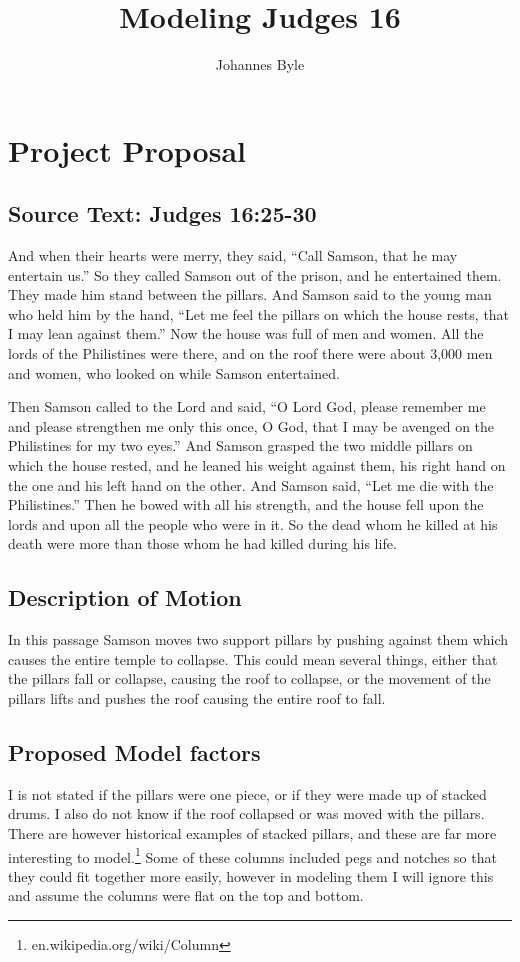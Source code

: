 \documentclass{article}
\begin{document}
\title{Modeling Judges 16}
\author{Johannes Byle}
\maketitle

\section*{Project Proposal}
\subsection*{Source Text: Judges 16:25-30}
And when their hearts were merry, they said, “Call Samson, that he may entertain us.” So they called Samson out of the prison, and he entertained them. They made him stand between the pillars. And Samson said to the young man who held him by the hand, “Let me feel the pillars on which the house rests, that I may lean against them.” Now the house was full of men and women. All the lords of the Philistines were there, and on the roof there were about 3,000 men and women, who looked on while Samson entertained.

Then Samson called to the Lord and said, “O Lord God, please remember me and please strengthen me only this once, O God, that I may be avenged on the Philistines for my two eyes.” And Samson grasped the two middle pillars on which the house rested, and he leaned his weight against them, his right hand on the one and his left hand on the other. And Samson said, “Let me die with the Philistines.” Then he bowed with all his strength, and the house fell upon the lords and upon all the people who were in it. So the dead whom he killed at his death were more than those whom he had killed during his life.\\
\subsection*{Description of Motion}
In this passage Samson moves two support pillars by pushing against them which causes the entire temple to collapse. This could mean several things, either that the pillars fall or collapse, causing the roof to collapse, or the movement of the pillars lifts and pushes the roof causing the entire roof to fall.
\subsection*{Proposed Model factors}
I is not stated if the pillars were one piece, or if they were made up of  stacked drums. I also do not know if the roof collapsed or was moved with the pillars. There are however historical examples of stacked pillars, and these are far more interesting to model.\footnote{en.wikipedia.org/wiki/Column}
Some of these columns included pegs and notches so that they could fit together more easily, however in modeling them I will ignore this and assume the columns were flat on the top and bottom.
\end{document}
